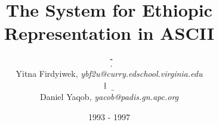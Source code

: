 \documentclass[twocolumn,a4paper]{article}
\begin{document}
\title{The System for Ethiopic Representation in ASCII} 

\author{ {\Washra \y\T\na \ \bi\ni\ya\m \ \f\r\d\y\we\q} \\ 
         Yitna Firdyiwek, \emph{ybf2u@curry.edschool.virginia.edu} \\
         {\Washra \da\n\E\l \ \ya{\Washrx \II}\qo\b \ \me{\Washrx \kWe}\n\n} \\
         Daniel Yaqob, \emph{yacob@padis.gn.apc.org} }

\date{1993 - 1997}


\maketitle
\thispagestyle{empty}







\pagebreak

\cleardoublepage

\end{document}
